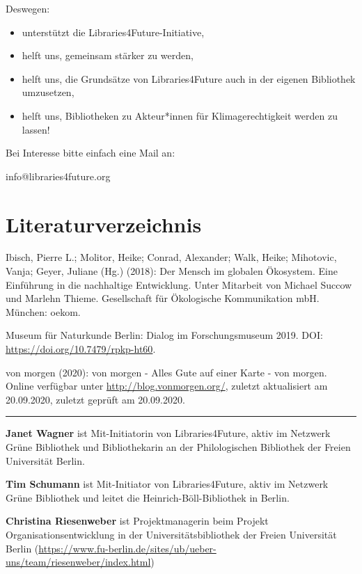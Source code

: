 \documentclass[a4paper,
fontsize=11pt,
oneside,
numbers=noperiodatend,
parskip=half-,
bibliography=totoc,
final
]{scrartcl}
\begin{document}
Deswegen:

\begin{itemize}
\tightlist
\item
  unterstützt die Libraries4Future-Initiative,
\item
  helft uns, gemeinsam stärker zu werden,
\item
  helft uns, die Grundsätze von Libraries4Future auch in der eigenen
  Bibliothek umzusetzen,
\item
  helft uns, Bibliotheken zu Akteur*innen für Klimagerechtigkeit werden
  zu lassen!
\end{itemize}

Bei Interesse bitte einfach eine Mail an:

info@libraries4future.org

\hypertarget{literaturverzeichnis}{%
\section{Literaturverzeichnis}\label{literaturverzeichnis}}

Ibisch, Pierre L.; Molitor, Heike; Conrad, Alexander; Walk, Heike;
Mihotovic, Vanja; Geyer, Juliane (Hg.) (2018): Der Mensch im globalen
Ökosystem. Eine Einführung in die nachhaltige Entwicklung. Unter
Mitarbeit von Michael Succow und Marlehn Thieme. Gesellschaft für
Ökologische Kommunikation mbH. München: oekom.

Museum für Naturkunde Berlin: Dialog im Forschungsmuseum 2019. DOI:
\url{https://doi.org/10.7479/rpkp-ht60}.

von morgen (2020): von morgen - Alles Gute auf einer Karte - von morgen.
Online verfügbar unter \url{http://blog.vonmorgen.org/}, zuletzt
aktualisiert am 20.09.2020, zuletzt geprüft am 20.09.2020.

\begin{center}\rule{0.5\linewidth}{0.5pt}\end{center}

\textbf{Janet Wagner} ist Mit-Initiatorin von Libraries4Future, aktiv im
Netzwerk Grüne Bibliothek und Bibliothekarin an der Philologischen
Bibliothek der Freien Universität Berlin.

\textbf{Tim Schumann} ist Mit-Initiator von Libraries4Future, aktiv im
Netzwerk Grüne Bibliothek und leitet die Heinrich-Böll-Bibliothek in
Berlin.

\textbf{Christina Riesenweber} ist Projektmanagerin beim Projekt
Organisationsentwicklung in der Universitätsbibliothek der Freien
Universität Berlin
(\url{https://www.fu-berlin.de/sites/ub/ueber-uns/team/riesenweber/index.html})
\end{document}
